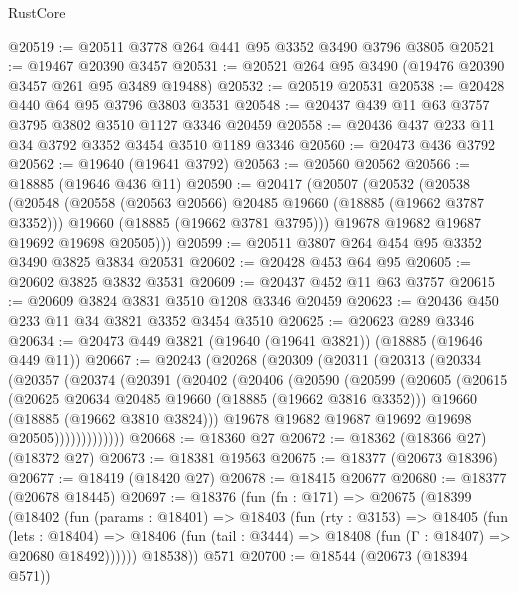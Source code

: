 \begin{lexlean}{RustCore}
\begin{coremodule}
@20519 := @20511 @3778 @264 @441 @95 @3352 @3490 @3796 @3805
@20521 := @19467 @20390 @3457
@20531 := @20521 @264 @95 @3490 (@19476 @20390 @3457 @261 @95 @3489 @19488)
@20532 := @20519 @20531
@20538 := @20428 @440 @64 @95 @3796 @3803 @3531
@20548 := @20437 @439 @11 @63 @3757 @3795 @3802 @3510 @1127 @3346 @20459
@20558 := @20436 @437 @233 @11 @34 @3792 @3352 @3454 @3510 @1189 @3346
@20560 := @20473 @436 @3792
@20562 := @19640 (@19641 @3792)
@20563 := @20560 @20562
@20566 := @18885 (@19646 @436 @11)
@20590 := @20417
    (@20507
      (@20532
        (@20538
          (@20548
            (@20558 (@20563 @20566) @20485 @19660 (@18885 (@19662 @3787 @3352)))
            @19660
            (@18885 (@19662 @3781 @3795)))
          @19678
          @19682
          @19687
          @19692
          @19698
          @20505)))
@20599 := @20511 @3807 @264 @454 @95 @3352 @3490 @3825 @3834 @20531
@20602 := @20428 @453 @64 @95
@20605 := @20602 @3825 @3832 @3531
@20609 := @20437 @452 @11 @63 @3757
@20615 := @20609 @3824 @3831 @3510 @1208 @3346 @20459
@20623 := @20436 @450 @233 @11 @34 @3821 @3352 @3454 @3510
@20625 := @20623 @289 @3346
@20634 := @20473 @449 @3821 (@19640 (@19641 @3821)) (@18885 (@19646 @449 @11))
@20667 := @20243
    (@20268
      (@20309
        (@20311
          (@20313
            (@20334
              (@20357
                (@20374
                  (@20391
                    (@20402
                      (@20406
                        (@20590
                          (@20599
                            (@20605
                              (@20615
                                (@20625 @20634 @20485 @19660 (@18885 (@19662 @3816 @3352)))
                                @19660
                                (@18885 (@19662 @3810 @3824)))
                              @19678
                              @19682
                              @19687
                              @19692
                              @19698
                              @20505)))))))))))))
@20668 := @18360 @27
@20672 := @18362 (@18366 @27) (@18372 @27)
@20673 := @18381 @19563
@20675 := @18377 (@20673 @18396)
@20677 := @18419 (@18420 @27)
@20678 := @18415 @20677
@20680 := @18377 (@20678 @18445)
@20697 := @18376
    (fun (fn : @171) =>
    @20675
      (@18399
        (@18402
          (fun (params : @18401) =>
          @18403
            (fun (rty : @3153) =>
            @18405
              (fun (lets : @18404) =>
              @18406 (fun (tail : @3444) => @18408 (fun (Γ : @18407) => @20680 @18492))))))
        @18538))
    @571
@20700 := @18544 (@20673 (@18394 @571))

\end{coremodule}
\end{lexlean}
